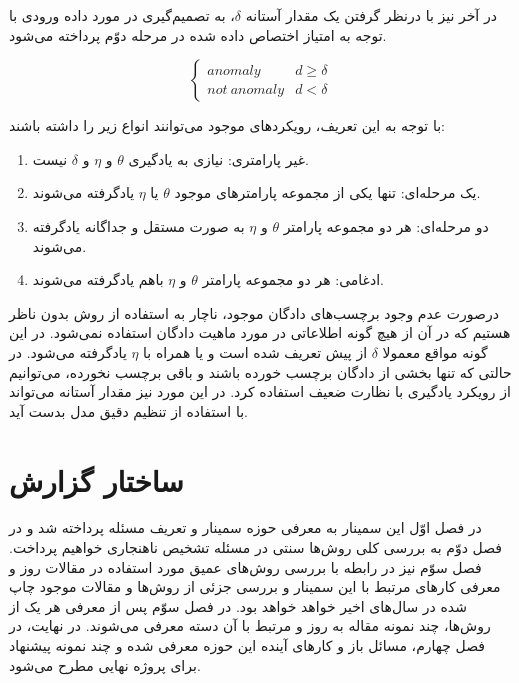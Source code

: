 \documentclass[12pt,a4paper]{report}
\theoremstyle{definition}
\theoremstyle{definition}
\begin{document}
در آخر نیز با درنظر گرفتن یک مقدار آستانه $\delta$، به تصمیم‌گیری در مورد داده ورودی با توجه به امتیاز اختصاص داده شده در مرحله دوّم پرداخته می‌شود.

$$
\left\{
	\begin{array}{ll}
		anomaly  & d \geq \delta \\
		not\ anomaly & d < \delta
	\end{array}
\right.
$$

با توجه به این تعریف، رویکرد‌های موجود می‌توانند انواع زیر را داشته باشند:
\begin{enumerate}
	\item {غیر پارامتری: نیازی به یادگیری $\theta$ و $\eta$ و $\delta$ نیست.}
	\item{یک مرحله‌ای: تنها یکی از مجموعه پارامترهای موجود $\theta$ یا  $\eta$ یاد‌گرفته می‌شوند.}
	\item{دو مرحله‌ای:‌ هر دو مجموعه پارامتر $\theta$ و $\eta$ به صورت مستقل و جداگانه یاد‌گرفته می‌شوند.}
	\item{ادغامی: هر دو مجموعه پارامتر $\theta$ و $\eta$ باهم یادگرفته می‌شوند. }
\end{enumerate}

درصورت عدم وجود برچسب‌های دادگان موجود، ناچار به استفاده از روش بدون ناظر هستیم که در آن از هیچ گونه اطلاعاتی در مورد ماهیت دادگان استفاده نمی‌شود. در  این گونه مواقع معمولا $\delta$ از پیش تعریف شده است و یا همراه با  $\eta$ یادگرفته می‌شود. در حالتی که تنها بخشی از دادگان برچسب خورده باشند و باقی برچسب نخورده، می‌توانیم از رویکرد یادگیری با نظارت ضعیف استفاده کرد. در این مورد نیز مقدار آستانه می‌تواند با استفاده از تنظیم دقیق مدل بدست آید.
	
	\section{ساختار گزارش}
در فصل اوّل این سمینار به معرفی حوزه سمینار و تعریف مسئله پرداخته شد و در فصل دوّم به بررسی کلی روش‌ها سنتی در مسئله تشخیص ناهنجاری خواهیم پرداخت. فصل سوّم نیز در رابطه با بررسی روش‌های عمیق مورد استفاده در مقالات روز و معرفی کار‌های مرتبط با این سمینار و بررسی جزئی از روش‌ها و مقالات موجود چاپ شده در سال‌های اخیر خواهد خواهد بود. در فصل سوّم پس از معرفی هر یک از روش‌ها، چند نمونه مقاله به روز و مرتبط با آن دسته معرفی می‌شوند. در نهایت، در فصل چهارم، مسائل باز و کار‌های آینده این حوزه معرفی شده و چند نمونه پیشنهاد برای پروژه نهایی مطرح می‌شود.
\end{document}
